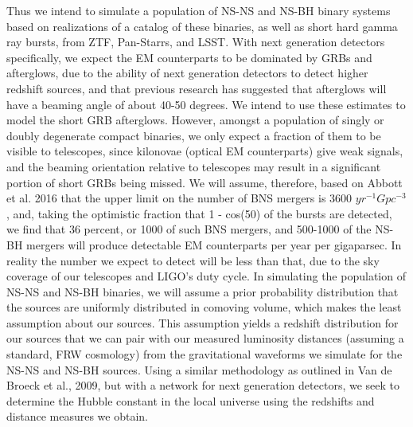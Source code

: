 \documentclass{article}
\begin{document}
Thus we intend to simulate a population of NS-NS and NS-BH binary systems based on realizations of a catalog of these binaries, as well as short hard gamma ray bursts, from ZTF, Pan-Starrs, and LSST.  With next generation detectors specifically, we expect the EM counterparts to be dominated by GRBs and afterglows, due to the ability of next generation detectors to detect higher redshift sources, and that previous research has suggested that afterglows will have a beaming angle of about 40-50 degrees.  We intend to use these estimates to model the short GRB afterglows.  However, amongst a population of singly or doubly degenerate compact binaries, we only expect a fraction of them to be visible to telescopes, since kilonovae (optical EM counterparts) give weak signals, and the beaming orientation relative to telescopes may result in a significant portion of short GRBs being missed.  We will assume, therefore, based on Abbott et al. 2016 that the upper limit on the number of BNS mergers is 3600 $yr^{-1}Gpc^{-3}$, and, taking the optimistic fraction that 1 - cos(50) of the bursts are detected, we find that 36 percent, or 1000 of such BNS mergers, and 500-1000 of the NS-BH mergers will produce detectable EM counterparts per year per gigaparsec.  In reality the number we expect to detect will be less than that, due to the sky coverage of our telescopes and LIGO's duty cycle.  In simulating the population of NS-NS and NS-BH binaries, we will assume a prior probability distribution that the sources are uniformly distributed in comoving volume, which makes the least assumption about our sources.  This assumption yields a redshift distribution for our sources that we can pair with our measured luminosity distances (assuming a standard, FRW cosmology) from the gravitational waveforms we simulate for the NS-NS and NS-BH sources.  Using a similar methodology as outlined in Van de Broeck et al., 2009, but with a network for next generation detectors, we seek to determine the Hubble constant in the local universe using the redshifts and distance measures we obtain.
\end{document}
